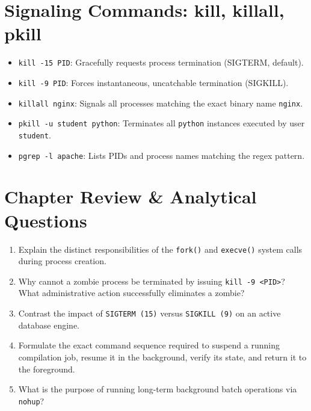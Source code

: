 \section{Signaling Commands: kill, killall, pkill}
\begin{itemize}[leftmargin=1.5em]
    \item \texttt{kill -15 PID}: Gracefully requests process termination (SIGTERM, default).
    \item \texttt{kill -9 PID}: Forces instantaneous, uncatchable termination (SIGKILL).
    \item \texttt{killall nginx}: Signals all processes matching the exact binary name \texttt{nginx}.
    \item \texttt{pkill -u student python}: Terminates all \texttt{python} instances executed by user \texttt{student}.
    \item \texttt{pgrep -l apache}: Lists PIDs and process names matching the regex pattern.
\end{itemize}

\section{Chapter Review \& Analytical Questions}
\begin{enumerate}[leftmargin=1.5em]
    \item Explain the distinct responsibilities of the \texttt{fork()} and \texttt{execve()} system calls during process creation.
    \item Why cannot a zombie process be terminated by issuing \texttt{kill -9 <PID>}? What administrative action successfully eliminates a zombie?
    \item Contrast the impact of \texttt{SIGTERM (15)} versus \texttt{SIGKILL (9)} on an active database engine.
    \item Formulate the exact command sequence required to suspend a running compilation job, resume it in the background, verify its state, and return it to the foreground.
    \item What is the purpose of running long-term background batch operations via \texttt{nohup}?
\end{enumerate}
